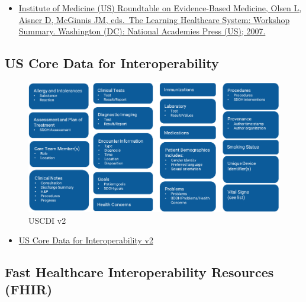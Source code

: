 \documentclass[
]{journal}
\providecommand{\tightlist}{%
  \setlength{\itemsep}{0pt}\setlength{\parskip}{0pt}}
\begin{document}
\begin{itemize}
\tightlist
\item
  \href{https://pubmed.ncbi.nlm.nih.gov/21452449/}{Institute of Medicine (US) Roundtable on Evidence-Based Medicine, Olsen L, Aisner D, McGinnis JM, eds.~The Learning Healthcare System: Workshop Summary. Washington (DC): National Academies Press (US); 2007.}
\end{itemize}

\hypertarget{us-core-data-for-interoperability}{%
\subsection{US Core Data for Interoperability}\label{us-core-data-for-interoperability}}

\begin{figure}

{\centering \includegraphics[width=1\linewidth]{assets/chapter_1/uscdi_v2} 

}

\caption{USCDI v2}\label{fig:uscdi}
\end{figure}

\begin{itemize}
\tightlist
\item
  \href{https:/healthit.gov/isa/uscdi-data-class}{US Core Data for Interoperability v2}
\end{itemize}

\hypertarget{fast-healthcare-interoperability-resources-fhir}{%
\subsection{Fast Healthcare Interoperability Resources (FHIR)}\label{fast-healthcare-interoperability-resources-fhir}}
\end{document}
